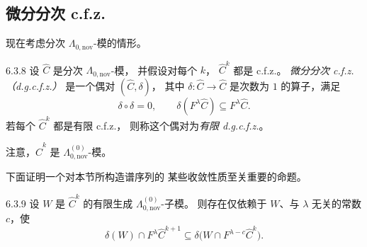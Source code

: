 
\subsection{微分分次 c.f.z.}
\label{subsec:6-3-2}

现在考虑分次 $\Lambda_{0,\mathrm{nov}}$-模的情形。

\begin{definition}{6.3.8}\label{def:6-3-8}
设 $\widehat C$ 是分次
$\Lambda_{0,\mathrm{nov}}$-模，
并假设对每个 $k$，
$\widehat C^k$ 都是 c.f.z.。
\emph{微分分次 c.f.z.（d.g.c.f.z.）}
是一个偶对 $(\widehat C,\delta)$，
其中 $\delta:\widehat C\to\widehat C$
是次数为 $1$ 的算子，满足
\[
\delta\circ\delta=0,
\qquad
\delta(F^\lambda\widehat C)
\subseteq F^\lambda\widehat C.
\]
若每个 $\widehat C^k$
都是有限 c.f.z.，
则称这个偶对为\emph{有限 d.g.c.f.z.}。
\end{definition}

注意，$\widehat C^k$ 是
$\Lambda_{0,\mathrm{nov}}^{(0)}$-模。

下面证明一个对本节所构造谱序列的
某些收敛性质至关重要的命题。

\begin{proposition}{6.3.9}\label{prop:6-3-9}
设 $W$ 是 $\widehat C^k$ 的有限生成
$\Lambda_{0,\mathrm{nov}}^{(0)}$-子模。
则存在仅依赖于 $W$、与 $\lambda$ 无关的常数 $c$，使
\[
\delta(W)\cap F^\lambda\widehat C^{k+1}
\subseteq
\delta\bigl(W\cap F^{\lambda-c}\widehat C^k\bigr).
\]
\end{proposition}

